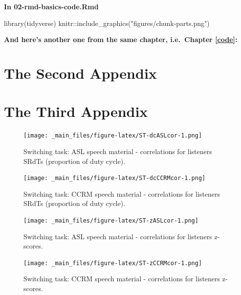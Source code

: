 \documentclass[a4paper, twoside]{templates/ociamthesis}
\newenvironment{Shaded}{\begin{snugshade}}{\end{snugshade}}
\newcommand{\FunctionTok}[1]{\textcolor[rgb]{0.00,0.00,0.00}{#1}}
\newcommand{\NormalTok}[1]{#1}
\newcommand{\SpecialCharTok}[1]{\textcolor[rgb]{0.00,0.00,0.00}{#1}}
\newcommand{\StringTok}[1]{\textcolor[rgb]{0.31,0.60,0.02}{#1}}
\renewenvironment{Shaded}
{
  \vspace{4pt}%
  \begin{snugshade}%
}{%
  \end{snugshade}%
  \vspace{4pt}%
}
\begin{document}
\textbf{In 02-rmd-basics-code.Rmd}

\begin{Shaded}
\begin{Highlighting}[]
\FunctionTok{library}\NormalTok{(tidyverse)}
\NormalTok{knitr}\SpecialCharTok{::}\FunctionTok{include\_graphics}\NormalTok{(}\StringTok{"figures/chunk{-}parts.png"}\NormalTok{)}
\end{Highlighting}
\end{Shaded}

\textbf{And here's another one from the same chapter, i.e.~Chapter \ref{code}:}

\hypertarget{the-second-appendix}{%
\chapter{The Second Appendix}\label{the-second-appendix}}

\hypertarget{the-third-appendix}{%
\chapter{The Third Appendix}\label{the-third-appendix}}

\begin{figure}
\centering
\texttt{[image: \_main\_files/figure-latex/ST-dcASLcor-1.png]}
\caption{\label{fig:ST-dcASLcor} Switching task: ASL speech material - correlations for listeners SRdTs (proportion of duty cycle).}
\end{figure}

\begin{figure}
\centering
\texttt{[image: \_main\_files/figure-latex/ST-dcCCRMcor-1.png]}
\caption{\label{fig:ST-dcCCRMcor} Switching task: CCRM speech material - correlations for listeners SRdTs (proportion of duty cycle).}
\end{figure}

\begin{figure}
\centering
\texttt{[image: \_main\_files/figure-latex/ST-zASLcor-1.png]}
\caption{\label{fig:ST-zASLcor} Switching task: ASL speech material - correlations for listeners z-scores.}
\end{figure}

\begin{figure}
\centering
\texttt{[image: \_main\_files/figure-latex/ST-zCCRMcor-1.png]}
\caption{\label{fig:ST-zCCRMcor} Switching task: CCRM speech material - correlations for listeners z-scores.}
\end{figure}
\end{document}
